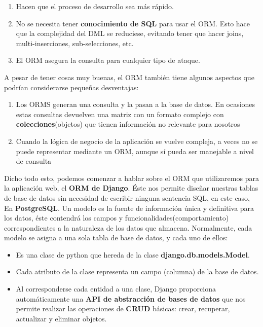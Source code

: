         \begin{enumerate}
            \item Hacen que el proceso de desarrollo sea más rápido.
            \item No se necesita tener \textbf{conocimiento de SQL } para usar el ORM. Esto
            hace que la complejidad del DML se reduciese, evitando tener que hacer joins,
            multi-inserciones, sub-selecciones, etc.
            \item El ORM asegura la consulta para cualquier tipo de ataque.
        \end{enumerate}

    A pesar de tener cosas muy buenas, el ORM también tiene algunos aspectos que podrían
    considerarse pequeñas desventajas:

        \begin{enumerate}
            \item Los ORMS generan una consulta y la pasan a la base de datos. En ocasiones
            estas consultas devuelven una matriz con un formato complejo con
            \textbf{colecciones}(objetos) que tienen información no relevante para nosotros
            \item Cuando la lógica de negocio de la aplicación se vuelve compleja, a veces
            no se puede representar mediante un ORM, aunque sí pueda ser manejable a nivel
            de consulta
        \end{enumerate}

    Dicho todo esto, podemos comenzar a hablar sobre el ORM que utilizaremos para la
    aplicación web, el \textbf{ORM de Django}. Éste nos permite diseñar nuestras tablas de 
    base de datos sin necesidad de escribir ninguna sentencia SQL, en este caso, En
    \textbf{PostgreSQL}. Un modelo es la fuente de información única y definitiva para los
    datos, éste contendrá los campos y funcionalidades(comportamiento) correspondientes a
    la naturaleza de los datos que almacena. Normalmente, cada modelo se asigna a una sola
    tabla de base de datos, y cada uno de ellos:

        \begin{itemize}
            \item Es una clase de python que hereda de la clase \textbf{django.db.models.Model}.
            \item Cada atributo de la clase representa un campo (columna) de la base de datos.
            \item Al corresponderse cada entidad a una clase, Django proporciona automáticamente
            una \textbf{API de abstracción de bases de datos} que nos permite realizar las
            operaciones de \textbf{CRUD} básicas: crear, recuperar, actualizar y eliminar
            objetos.
        \end{itemize}

